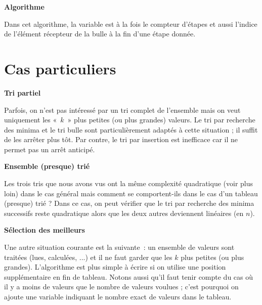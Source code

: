 	{\sffamily\bfseries\upshape
	Algorithme}

	Dans cet algorithme, la variable  est à
	la fois le compteur d’étapes et aussi l’indice de l’élément récepteur
	de la bulle à la fin d’une étape donnée.

	\bigskip
	

	\bigskip

\section{Cas particuliers}

	{\sffamily\bfseries\upshape
	Tri partiel}

		Parfois, on n’est pas intéressé par un tri complet de l’ensemble mais on
		veut uniquement les «~$k$~» plus petites (ou plus grandes) valeurs. Le
		tri par recherche des minima et le tri bulle sont particulièrement
		adaptés à cette situation ; il suffit de les arrêter plus tôt. Par
		contre, le tri par insertion est inefficace car il ne permet pas un
		arrêt anticipé.

	{\sffamily\bfseries\upshape
	Ensemble (presque) trié}

		Les trois tris que nous avons vus ont la même complexité quadratique
		(voir plus loin) dans le cas général mais comment se comportent-ils
		dans le cas d’un tableau (presque) trié ? Dans ce cas, on peut vérifier
		que le tri par recherche des minima successifs reste quadratique alors
		que les deux autres deviennent linéaires (en $n$).

	{\sffamily\bfseries\upshape
	Sélection des meilleurs}

		Une autre situation courante est la suivante~: un ensemble de valeurs
		sont traitées (lues, calculées, ...) et il ne faut garder que les
		$k$ plus petites (ou plus grandes).
		L'algorithme est plus simple à écrire si on utilise
		une position supplémentaire en fin de tableau. Notons aussi qu’il faut
		tenir compte du cas où il y a moins de valeurs que le nombre de valeurs
		voulues ; c’est pourquoi on ajoute une variable indiquant le nombre
		exact de valeurs dans le tableau.

